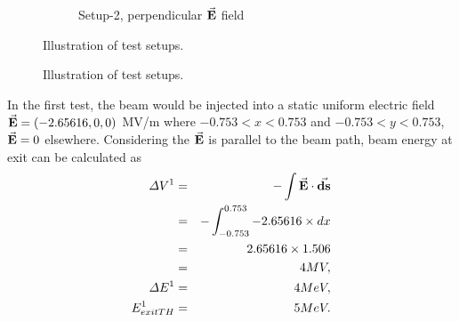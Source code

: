 \documentclass[a4paper,oneside,12pt]{report}
\numberwithin{equation}{chapter}
\begin{document}
{\begin{figure}[H]
\begin{subfigure}{0.48\textwidth}
        \caption*{Setup-2, perpendicular $\vec{\textbf{E}}$ field}
    \end{subfigure}
    \caption{Illustration of test setups.}
\end{figure} \fi
\vspace{20pt}
\begin{figure}[H]
    \centering
    \qquad{}%
    \vspace{5pt}
    \caption{Illustration of test setups.}
\end{figure}
\clearpage
In the first test, the beam would be injected into a static uniform electric field \\
$\vec{\textbf{E}}=(-2.65616, 0, 0)$ MV/m where $-0.753<x<0.753$ and $-0.753<y<0.753$, $\vec{\textbf{E}}=0$ elsewhere.
Considering the $\vec{\textbf{E}}$ is parallel to the beam path, beam energy at exit can be calculated as
\vspace{-10pt}\begin{eqnarray}
    \Delta V^1 &=& - \int \vec{\textbf{E}} \cdot \vec{\textbf{ds}} \nonumber\\
             &=& - \int_{-0.753}^{0.753} -2.65616 \times dx \nonumber\\
             &=& 2.65616 \times 1.506 \nonumber\\
             &=& 4 MV, \\
    \Delta E^1 &=& 4 MeV, \\
    E_{exitTH}^1 &=& 5 MeV.
\end{eqnarray}

}
\end{document}
